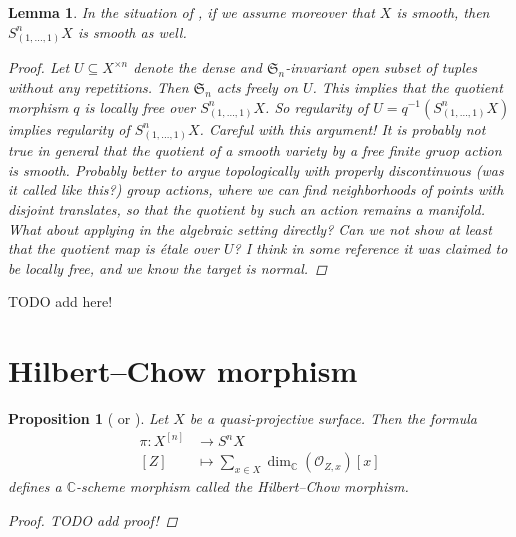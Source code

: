 \documentclass[12pt,a4paper]{amsart}
\theoremstyle{plain}
\newtheorem{lm}[thm]{Lemma}
\newtheorem{prop}[thm]{Proposition}
\theoremstyle{definition}
\theoremstyle{remark}
\begin{document}
\begin{lm}\label{lm:smoothstratum}
  In the situation of , if we assume moreover that $X$ is smooth, then $S^{n}_{(1, \ldots, 1)}X$ is smooth as well.
  
  \begin{proof}
    Let $U \subseteq X^{\times n}$ denote the dense and $\mathfrak{S}_{n}$-invariant open subset of tuples without any repetitions.
    Then $\mathfrak{S}_{n}$ acts freely on $U$.
    This implies that the quotient morphism $q$ is locally free over $S^{n}_{(1,\ldots,1)}X$.
    So regularity of $U = q^{-1}(S^{n}_{(1, \ldots, 1)}X)$ implies regularity of $S^{n}_{(1, \ldots, 1)}X$.
    \color{red} Careful with this argument! It is probably not true in general that the quotient of a smooth variety by a free finite gruop action is smooth. \color{black}
    Probably better to argue topologically with properly discontinuous (was it called like this?) group actions, where we can find neighborhoods of points with disjoint translates, so that the quotient by such an action remains a manifold.
    What about applying \cite[\href{https://stacks.math.columbia.edu/tag/02K5}{Tag 02K5}]{stacks-project} in the algebraic setting directly?
    Can we not show at least that the quotient map is étale over $U$?
    I think in some reference it was claimed to be locally free, and we know the target is normal.
  \end{proof}
\end{lm}

\color{red} TODO add \cite[Examples 3.5 and 3.6]{rot16} here! \color{black}

\section{Hilbert--Chow morphism}

\begin{prop}[{\cite[\S 3.2]{leh00} or \cite[p.~41]{ber08}}]
  Let $X$ be a quasi-projective surface.
  Then the formula
  \begin{align*}
    \pi \colon X^{[n]} & \longrightarrow S^{n}X \\
    [Z] & \longmapsto \sum_{x \in X} \dim_{\mathbb{C}}(\mathscr{O}_{Z,x})[x] 
  \end{align*}
  defines a $\mathbb{C}$-scheme morphism called the \textit{Hilbert--Chow morphism}.
  
  \begin{proof}
    \color{red}
    TODO add proof!
    \color{black}
  \end{proof}
\end{prop}
\end{document}
